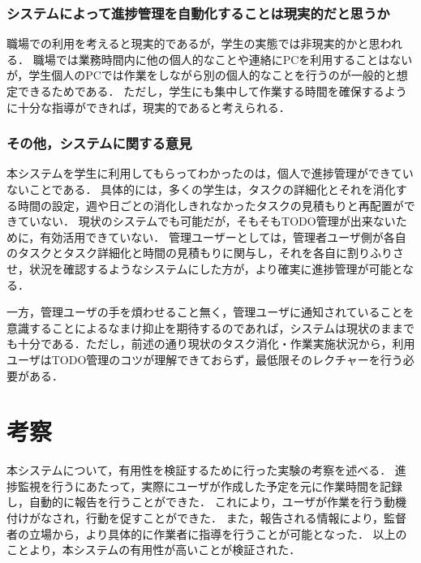 \subsubsection{システムによって進捗管理を自動化することは現実的だと思うか}
職場での利用を考えると現実的であるが，学生の実態では非現実的かと思われる．
職場では業務時間内に他の個人的なことや連絡にPCを利用することはないが，学生個人のPCでは作業をしながら別の個人的なことを行うのが一般的と想定できるためである．
ただし，学生にも集中して作業する時間を確保するように十分な指導ができれば，現実的であると考えられる．

\subsubsection{その他，システムに関する意見}
本システムを学生に利用してもらってわかったのは，個人で進捗管理ができていないことである．
具体的には，多くの学生は，タスクの詳細化とそれを消化する時間の設定，週や日ごとの消化しきれなかったタスクの見積もりと再配置ができていない．
現状のシステムでも可能だが，そもそもTODO管理が出来ないために，有効活用できていない．
管理ユーザーとしては，管理者ユーザ側が各自のタスクとタスク詳細化と時間の見積もりに関与し，それを各自に割りふりさせ，状況を確認するようなシステムにした方が，より確実に進捗管理が可能となる．

一方，管理ユーザの手を煩わせること無く，管理ユーザに通知されていることを意識することによるなまけ抑止を期待するのであれば，システムは現状のままでも十分である．ただし，前述の通り現状のタスク消化・作業実施状況から，利用ユーザはTODO管理のコツが理解できておらず，最低限そのレクチャーを行う必要がある．

\section{考察}
本システムについて，有用性を検証するために行った実験の考察を述べる．
進捗監視を行うにあたって，実際にユーザが作成した予定を元に作業時間を記録し，自動的に報告を行うことができた．
これにより，ユーザが作業を行う動機付けがなされ，行動を促すことができた．
また，報告される情報により，監督者の立場から，より具体的に作業者に指導を行うことが可能となった．
以上のことより，本システムの有用性が高いことが検証された．
